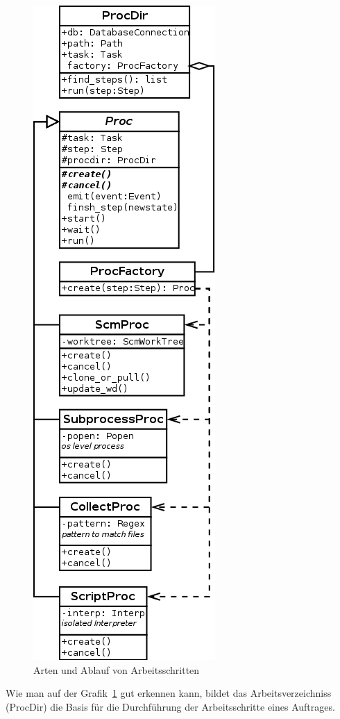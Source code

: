 \begin{figure}[!ht]
  \centering
  \label{fig:klassen-arten-arbeitsschritt}
  \includegraphics[height=0.8\textheight]{imageinput/klassen-arten-arbeitsschritt.png}
  \caption{Arten und Ablauf von Arbeitsschritten}
\end{figure}

Wie man auf der Grafik~\ref{fig:klassen-arten-arbeitsschritt} gut erkennen kann,
bildet das Arbeitsverzeichniss (ProcDir) die Basis
für die Durchführung der Arbeitsschritte eines Auftrages.

